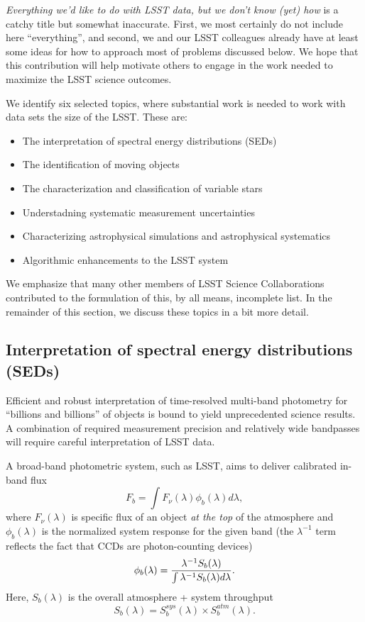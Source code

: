 \documentclass{iau}
\begin{document}
{\it Everything we'd like to do with LSST data, but we don’t know
  (yet) how} is a catchy title but somewhat inaccurate. First, we most
certainly do not include here ``everything'', and second, we and our
LSST colleagues already have at least some ideas for how to approach
most of problems discussed below.  We hope that this contribution will
help motivate others to engage in the work needed to maximize the LSST
science outcomes.

We identify six selected topics, where substantial work is needed to
work with data sets the size of the LSST. These are:
\begin{itemize}
\item The interpretation of spectral energy distributions (SEDs)
\item The identification of moving objects
\item The characterization and classification of variable stars 
\item Understadning systematic measurement uncertainties
\item Characterizing astrophysical simulations and astrophysical
  systematics
\item Algorithmic enhancements to the LSST system 
\end{itemize}

We emphasize that many other members of LSST Science Collaborations contributed to
the formulation of this, by all means, incomplete list. In the remainder of this section, 
we discuss these topics in a bit more detail. 


\subsection{Interpretation of spectral energy distributions (SEDs)}

Efficient and robust interpretation of time-resolved multi-band photometry for “billions and 
billions” of objects is bound to yield unprecedented science results. A combination of 
required measurement precision and relatively wide bandpasses will require careful
interpretation of LSST data. 

A broad-band photometric system, such as LSST, aims to deliver calibrated in-band flux
\begin{equation}
\label{Fb}
             F_b = \int{F_\nu(\lambda) \phi_b(\lambda) d\lambda},
\end{equation}
where $F_\nu(\lambda)$ is specific flux of an object {\it at the top} of 
the atmosphere and $\phi_b(\lambda)$ is the normalized system response 
for the given band (the $\lambda^{-1}$  term reflects the fact that CCDs 
are photon-counting devices)
\begin{equation}
\label{PhiDef}
\phi_b(\lambda) = {\lambda^{-1} S_b(\lambda) \over \int{\lambda^{-1} S_b(\lambda) d\lambda}}.
\end{equation}
Here, $S_b(\lambda)$ is the overall atmosphere + system throughput
\begin{equation}
\label{SDef}
         S_b(\lambda) = S_b^{sys}(\lambda) \times S_b^{atm}(\lambda). 
\end{equation}
\end{document}

